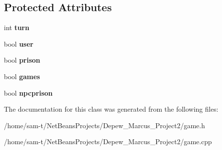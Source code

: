 \subsection*{Protected Attributes}
\begin{DoxyCompactItemize}
\item 
\mbox{\label{classgame_a9fd125e038ba086742514c2c80f4dc3a}} 
int {\bfseries turn}
\item 
\mbox{\label{classgame_a630f024e32f703ae8d194b4135aaaed2}} 
bool {\bfseries user}
\item 
\mbox{\label{classgame_aa56e574de7e8a5106cf7545576727cc6}} 
bool {\bfseries prison}
\item 
\mbox{\label{classgame_a17b04a94df87079c129ce49e68760b2a}} 
bool {\bfseries games}
\item 
\mbox{\label{classgame_af223bd2db953348f9fa8a8b075871fcb}} 
bool {\bfseries npcprison}
\end{DoxyCompactItemize}


The documentation for this class was generated from the following files\+:\begin{DoxyCompactItemize}
\item 
/home/sam-\/t/\+Net\+Beans\+Projects/\+Depew\+\_\+\+Marcus\+\_\+\+Project2/game.\+h\item 
/home/sam-\/t/\+Net\+Beans\+Projects/\+Depew\+\_\+\+Marcus\+\_\+\+Project2/game.\+cpp\end{DoxyCompactItemize}
